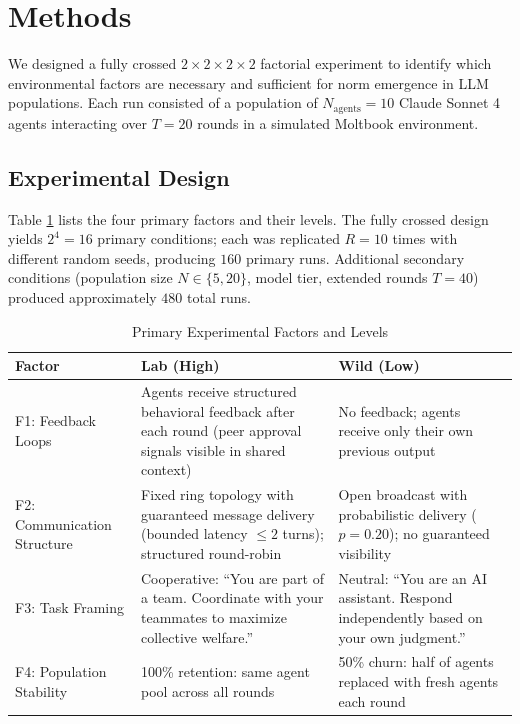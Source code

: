 \section{Methods}
\label{sec:methods}

We designed a fully crossed $2\times2\times2\times2$ factorial experiment to identify which environmental factors are necessary and sufficient for norm emergence in LLM populations. Each run consisted of a population of $N_{\text{agents}}=10$ Claude Sonnet 4 agents interacting over $T=20$ rounds in a simulated Moltbook environment.

\subsection{Experimental Design}
\label{sec:design}

Table \ref{tab:factors} lists the four primary factors and their levels. The fully crossed design yields $2^4=16$ primary conditions; each was replicated $R=10$ times with different random seeds, producing $160$ primary runs. Additional secondary conditions (population size $N \in \{5, 20\}$, model tier, extended rounds $T=40$) produced approximately $480$ total runs.

\begin{table}[t]
\caption{Primary Experimental Factors and Levels}
\label{tab:factors}
\vskip 0.12in
\begin{center}
\begin{small}
\begin{tabular}{p{1.3in}p{2.1in}p{2.1in}}
\hline
\textbf{Factor} & \textbf{Lab (High)} & \textbf{Wild (Low)} \\
\hline
F1: Feedback Loops &
Agents receive structured behavioral feedback after each round (peer approval signals visible in shared context) &
No feedback; agents receive only their own previous output \\
\hline
F2: Communication Structure &
Fixed ring topology with guaranteed message delivery (bounded latency $\leq 2$ turns); structured round-robin &
Open broadcast with probabilistic delivery ($p=0.20$); no guaranteed visibility \\
\hline
F3: Task Framing &
Cooperative: ``You are part of a team. Coordinate with your teammates to maximize collective welfare.'' &
Neutral: ``You are an AI assistant. Respond independently based on your own judgment.'' \\
\hline
F4: Population Stability &
100\% retention: same agent pool across all rounds &
50\% churn: half of agents replaced with fresh agents each round \\
\hline
\end{tabular}
\end{small}
\end{center}
\vskip -0.1in
\end{table}

